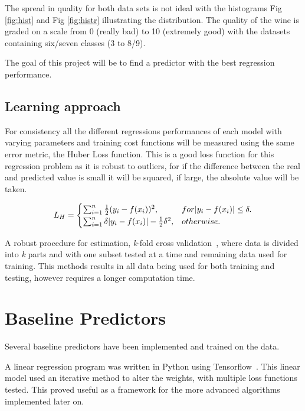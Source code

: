 \documentclass[10pt,twocolumn,letterpaper]{article}
\DeclarePairedDelimiter\abs{\lvert}{\rvert}%
\begin{document}
The spread in quality for both data sets is not ideal with the histograms Fig \ref{fig:hist} and Fig \ref{fig:histr} illustrating the distribution. The quality of the wine is graded on a scale from 0 (really bad) to 10 (extremely good) with the datasets containing six/seven classes (3 to 8/9).

The goal of this project will be to find a predictor with the best regression performance.

\subsection{Learning approach}

For consistency all the different regressions performances of each model with varying parameters and training cost functions will be measured using the same error metric, the Huber Loss function. This is a good loss function for this regression problem as it is robust to outliers, for if the difference between the real and predicted value is small it will be squared, if large, the absolute value will be taken.

\begin{equation}
L_H = \begin{cases}
\sum_{i = 1}^{n} \frac{1}{2} (y_i - f(x_i))^2, & for \abs{y_i - f(x_i)} \leq \delta. \\
\sum_{i = 1}^{n} \delta \abs{y_i - f(x_i)} - \frac{1}{2} \delta^2, & otherwise.
\end{cases}
\label{eq:1}
\end{equation}

A robust procedure for estimation, \textit{k}-fold cross validation~\cite{CrossValidation}, where data is divided into \textit{k} parts and with one subset tested at a time and remaining data used for training. This methods results in all data being used for both training and testing, however requires a longer computation time.

\section{Baseline Predictors}
Several baseline predictors have been implemented and trained on the data. 

A linear regression program was written in Python using Tensorflow~\cite{tensorflow2015-whitepaper}. This linear model used an iterative method to alter the weights, with multiple loss functions tested. This proved useful as a framework for the more advanced algorithms implemented later on.
\end{document}
